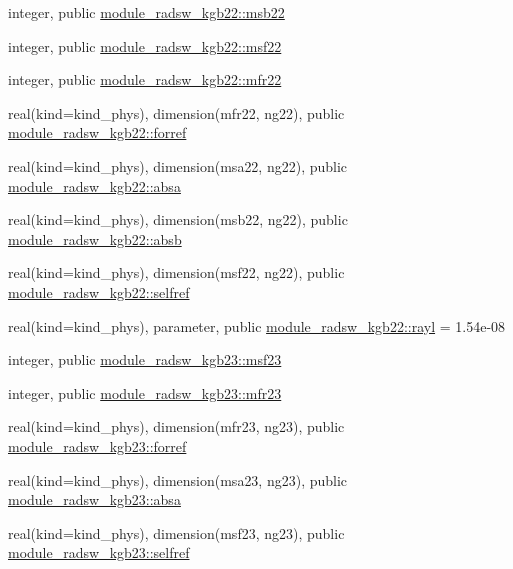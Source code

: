 \begin{DoxyCompactItemize}
\item 
integer, public \hyperlink{group__module__radsw__main_ga3398f8d12ec0349b44197873ac58fd98}{module\+\_\+radsw\+\_\+kgb22\+::msb22}
\item 
integer, public \hyperlink{group__module__radsw__main_ga0903a020c9e4a4f7c21911d2ab98fd46}{module\+\_\+radsw\+\_\+kgb22\+::msf22}
\item 
integer, public \hyperlink{group__module__radsw__main_ga0afe8facbe4837a22c96a0d2000a20ee}{module\+\_\+radsw\+\_\+kgb22\+::mfr22}
\item 
real(kind=kind\+\_\+phys), dimension(mfr22, ng22), public \hyperlink{group__module__radsw__main_ga509916fac772945555a1b3fd0d002c93}{module\+\_\+radsw\+\_\+kgb22\+::forref}
\item 
real(kind=kind\+\_\+phys), dimension(msa22, ng22), public \hyperlink{group__module__radsw__main_ga15ed79e7136ed6d7f11c19a81281af53}{module\+\_\+radsw\+\_\+kgb22\+::absa}
\item 
real(kind=kind\+\_\+phys), dimension(msb22, ng22), public \hyperlink{group__module__radsw__main_ga60403e7d343c85e965f3507b0db0f2a5}{module\+\_\+radsw\+\_\+kgb22\+::absb}
\item 
real(kind=kind\+\_\+phys), dimension(msf22, ng22), public \hyperlink{group__module__radsw__main_gabc3bd99e8ad7d1f09fb7fab7ed67a32b}{module\+\_\+radsw\+\_\+kgb22\+::selfref}
\item 
real(kind=kind\+\_\+phys), parameter, public \hyperlink{group__module__radsw__main_gae77b766677ea476e2ba14b88e511870a}{module\+\_\+radsw\+\_\+kgb22\+::rayl} = 1.\+54e-\/08
\item 
integer, public \hyperlink{group__module__radsw__main_gab96959c26232963a568609451483843e}{module\+\_\+radsw\+\_\+kgb23\+::msf23}
\item 
integer, public \hyperlink{group__module__radsw__main_ga78b43ec4bc2afd4f520480a8410d9df5}{module\+\_\+radsw\+\_\+kgb23\+::mfr23}
\item 
real(kind=kind\+\_\+phys), dimension(mfr23, ng23), public \hyperlink{group__module__radsw__main_ga18fabad311919ee30b2d367fbe250bcc}{module\+\_\+radsw\+\_\+kgb23\+::forref}
\item 
real(kind=kind\+\_\+phys), dimension(msa23, ng23), public \hyperlink{group__module__radsw__main_ga2541e41c7d445a2ce73283e2fb76270c}{module\+\_\+radsw\+\_\+kgb23\+::absa}
\item 
real(kind=kind\+\_\+phys), dimension(msf23, ng23), public \hyperlink{group__module__radsw__main_gae4e51bcb3c3cbaaf1476d5ab18b072e5}{module\+\_\+radsw\+\_\+kgb23\+::selfref}

\end{DoxyCompactItemize}
